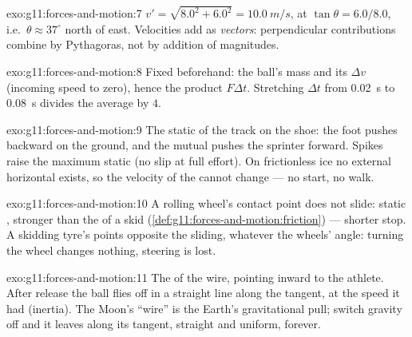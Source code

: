 \begin{solution}{exo:g11:forces-and-motion:7}
$v' = \sqrt{8.0^2 + 6.0^2} = \qty{10.0}{m/s}$, at $\tan\theta =
6.0/8.0$, i.e.\ $\theta \approx 37^\circ$ north of east. Velocities add
as \emph{vectors}: perpendicular contributions combine by Pythagoras,
not by addition of magnitudes.
\end{solution}

\begin{solution}{exo:g11:forces-and-motion:8}
Fixed beforehand: the ball's mass and its $\Delta v$ (incoming speed to
zero), hence the product $F\Delta t$. Stretching $\Delta t$ from
\qty{0.02}{s} to \qty{0.08}{s} divides the average  by $4$.
\end{solution}

\begin{solution}{exo:g11:forces-and-motion:9}
The static  of the track on the shoe: the foot pushes backward
on the ground, and the mutual  pushes the sprinter
forward. Spikes raise the maximum static  (no slip at full
effort). On frictionless ice no external horizontal  exists, so
the velocity of the  cannot change --- no start, no walk.
\end{solution}

\begin{solution}{exo:g11:forces-and-motion:10}
A rolling wheel's contact point does not slide: static ,
stronger than the  of a skid
(\cref{def:g11:forces-and-motion:friction}) --- shorter stop. A
skidding tyre's  points opposite the sliding, whatever
the wheels' angle: turning the wheel changes nothing, steering is lost.
\end{solution}

\begin{solution}{exo:g11:forces-and-motion:11}
The  of the wire, pointing inward to the athlete. After release
the ball flies off in a straight line along the tangent, at the speed
it had (inertia). The Moon's ``wire'' is the Earth's gravitational
pull; switch gravity off and it leaves along its tangent, straight and
uniform, forever.
\end{solution}

